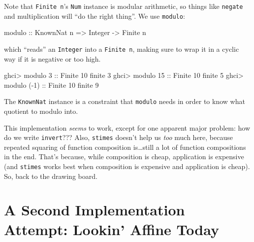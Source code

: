 \documentclass[]{article}
\newenvironment{Shaded}{}{}
\newcommand{\DataTypeTok}[1]{\textcolor[rgb]{0.56,0.13,0.00}{#1}}
\newcommand{\DecValTok}[1]{\textcolor[rgb]{0.25,0.63,0.44}{#1}}
\newcommand{\NormalTok}[1]{#1}
\newcommand{\OperatorTok}[1]{\textcolor[rgb]{0.40,0.40,0.40}{#1}}
\newcommand{\OtherTok}[1]{\textcolor[rgb]{0.00,0.44,0.13}{#1}}
\begin{document}
Note that \texttt{Finite\ n}'s \texttt{Num} instance is modular arithmetic, so
things like \texttt{negate} and multiplication will ``do the right thing''. We
use \texttt{modulo}:

\begin{Shaded}
\begin{Highlighting}[]
\OtherTok{modulo ::} \DataTypeTok{KnownNat}\NormalTok{ n }\OtherTok{=>} \DataTypeTok{Integer} \OtherTok{{-}>} \DataTypeTok{Finite}\NormalTok{ n}
\end{Highlighting}
\end{Shaded}

which ``reads'' an \texttt{Integer} into a \texttt{Finite\ n}, making sure to
wrap it in a cyclic way if it is negative or too high.

\begin{Shaded}
\begin{Highlighting}[]
\NormalTok{ghci}\OperatorTok{>}\NormalTok{ modulo }\DecValTok{3}\OtherTok{ ::} \DataTypeTok{Finite} \DecValTok{10}
\NormalTok{finite }\DecValTok{3}
\NormalTok{ghci}\OperatorTok{>}\NormalTok{ modulo }\DecValTok{15}\OtherTok{ ::} \DataTypeTok{Finite} \DecValTok{10}
\NormalTok{finite }\DecValTok{5}
\NormalTok{ghci}\OperatorTok{>}\NormalTok{ modulo (}\OperatorTok{{-}}\DecValTok{1}\NormalTok{)}\OtherTok{ ::} \DataTypeTok{Finite} \DecValTok{10}
\NormalTok{finite }\DecValTok{9}
\end{Highlighting}
\end{Shaded}

The \texttt{KnownNat} instance is a constraint that \texttt{modulo} needs in
order to know what quotient to modulo into.

This implementation \emph{seems} to work, except for one apparent major problem:
how do we write \texttt{invert}??? Also, \texttt{stimes} doesn't help us
\emph{too} much here, because repeated squaring of function composition
is\ldots still a lot of function compositions in the end. That's because, while
composition is cheap, application is expensive (and \texttt{stimes} works best
when composition is expensive and application is cheap). So, back to the drawing
board.

\hypertarget{a-second-implementation-attempt-lookin-affine-today}{%
\section{A Second Implementation Attempt: Lookin' Affine
Today}\label{a-second-implementation-attempt-lookin-affine-today}}
\end{document}
